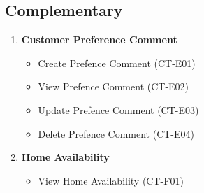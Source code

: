 \documentclass[11pt]{article}
\begin{document}
		\subsection{Complementary}
			\begin{enumerate}[i]
				\item \textbf{Customer Preference Comment}
				\begin{itemize}
					\item Create Prefence Comment (CT-E01)
					\item View Prefence Comment (CT-E02)
					\item Update Prefence Comment (CT-E03)
					\item Delete Prefence Comment (CT-E04)
				\end{itemize}
				
				\item \textbf{Home Availability}
				\begin{itemize}
					\item View Home Availability (CT-F01)
				\end{itemize}
			\end{enumerate}
	
\end{document}
